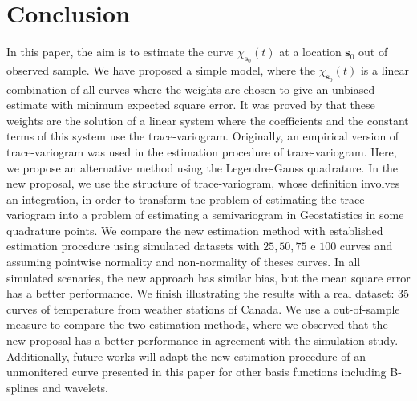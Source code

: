 \documentclass[12pt]{interact}
\theoremstyle{plain}%
\theoremstyle{definition}
\theoremstyle{remark}
\begin{document}
\section{Conclusion}\label{sec:conclusion}

In this paper, the aim is to estimate the curve \(\chi_{\bm{s}_0}(t)\) at a location \(\bm{s}_0\) out of observed sample. We have proposed a simple model, where the \(\chi_{\bm{s}_0}(t)\) is a linear combination of all curves where the weights are chosen to give an unbiased estimate with minimum expected square error. It was proved by \citet{giraldo2011ordinary} that these weights are the solution of a linear system where the coefficients and the constant terms of this system use the trace-variogram. Originally, an empirical version of trace-variogram was used in the estimation procedure of trace-variogram. Here, we propose an alternative method using the Legendre-Gauss quadrature. In the new proposal, we use the structure of trace-variogram, whose definition involves an integration, in order to transform the problem of estimating the trace-variogram into a problem of estimating a semivariogram in Geostatistics in some quadrature points. We compare the new estimation method with established estimation procedure using simulated datasets with \(25,50,75\) e \(100\) curves and assuming pointwise normality and non-normality of theses curves. In all simulated scenaries, the new approach has similar bias, but the mean square error has a better performance. We finish illustrating the results with a real dataset: 35 curves of temperature from weather stations of Canada. We use a out-of-sample measure to compare the two estimation methods, where we observed that the new proposal has a better performance in agreement with the simulation study. Additionally, future works will adapt the new estimation procedure of an unmonitered curve presented in this paper for other basis functions including B-splines and wavelets.


\end{document}
